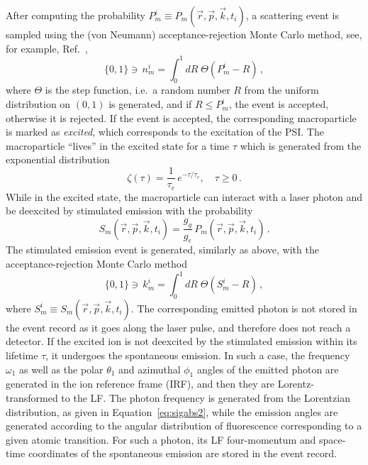 After computing the probability $P_m^i\equiv P_m(\vec{r},\vec{p},\vec{k},t_i)$, a scattering event is sampled using the (von Neumann) acceptance-rejection Monte Carlo method, see, for example, Ref.~\cite{Fishman:1996},
\begin{equation}
    \{0,1\} \ni \,  n_m^i = \int_0^1 dR\;\Theta(P_m^i - R)\,,
    \label{eq:RejMet}
\end{equation}
where $\Theta$ is the step function, i.e.\ a random number $R$ from the uniform distribution on $(0,1)$ is generated, and if $R\le P_m^i$, the event is accepted, otherwise it is rejected.  If the event is accepted, the corresponding macroparticle is marked as {\em excited}, which corresponds to the excitation of the PSI.  The macroparticle ``lives'' in the excited state for a time $\tau$ which is generated from the exponential distribution
\begin{equation}
    \zeta(\tau) = \frac{1}{\tau_e}\, e^{-\tau/\tau_e},\quad \tau \ge 0\,.
    \label{eq:ExpDis}
\end{equation}
While in the excited state, the macroparticle can interact with a laser photon and be deexcited by stimulated emission with the probability
\begin{equation}
    S_m(\vec{r},\vec{p},\vec{k},t_i) = \frac{g_g}{g_e}\,P_m(\vec{r},\vec{p},\vec{k},t_i)\,.
    \label{eq:StimEmProb}
\end{equation}
The stimulated emission event is generated, similarly as above, with the acceptance-rejection Monte Carlo method
\begin{equation}
    \{0,1\} \ni \, k_m^i = \int_0^1 dR\;\Theta(S_m^i - R)\,,
\label{eq:SERM}
\end{equation}
where $S_m^i\equiv S_m(\vec{r},\vec{p},\vec{k},t_i)$.  The corresponding emitted photon is not stored in the event record {as it goes along the laser pulse, and therefore does not reach a detector}.  If the excited ion is not deexcited by the stimulated emission within its lifetime $\tau$, it undergoes the spontaneous emission.  In such a case, the frequency $\omega_1$ as well as the polar $\theta_1$ and azimuthal $\phi_1$ angles of the emitted photon are generated in the ion reference frame (IRF), and then they are Lorentz-transformed to the LF.  The photon frequency is generated from the Lorentzian distribution, as given in Equation~\ref{eq:sigabs2}, while the emission angles are generated according to the angular distribution of fluorescence corresponding to a given atomic transition.  For such a photon, its LF four-momentum and space-time coordinates of the spontaneous emission are stored in the event record.

